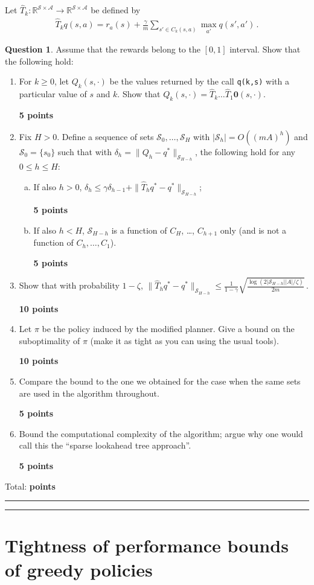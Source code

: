 \documentclass{article}
\newcommand{\norm}[1]{\| #1 \|}
\newcommand{\R}{\mathbb{R}}
\DeclareMathOperator*{\1}{\mathbbm{1}}
\newcommand{\0}{\mathbf{0}}
\newcounter{DocPoints}
\newcounter{QuestionPoints}
\newcommand{\points}[1]{	\par\mbox{}\par\noindent\hfill {\bf #1 points}	\addtocounter{DocPoints}{#1}
	\addtocounter{QuestionPoints}{#1}
}
\newcommand{\tpoints}[1]{        	\ifthenelse{\isempty{#1}}	{	}	{		\addtocounter{DocPoints}{#1}
		\addtocounter{QuestionPoints}{#1}
	}													 	\par\mbox{}\par\noindent\hfill {Total: \bf \arabic{QuestionPoints}\xspace points}\par\mbox{}\par\hrule\hrule
	\setcounter{QuestionPoints}{0}
}
\theoremstyle{definition}
\newtheorem{question}{Question}
\theoremstyle{remark}
\newcommand{\cS}{\mathcal{S}}
\newcommand{\cA}{\mathcal{A}}
\begin{document}
Let $\hat T_k: \R^{\cS \times \cA} \to \R^{\cS \times \cA}$ be defined by 
\begin{align*}
\hat T_k q (s,a) = r_a(s) + \frac{\gamma}{m} \sum_{s'\in C_k(s,a)} \max_{a'} q(s',a')\,.
\end{align*}

\begin{question}
Assume that the rewards belong to the $[0,1]$ interval.
Show that the following hold:
\begin{enumerate}
\item For $k\ge 0$, let $Q_k(s,\cdot)$ be the values returned by the call {\tt q(k,s)} with a particular value of $s$ and $k$. Show that $Q_k(s,\cdot) = \hat T_k \dots \hat T_1 \0 (s,\cdot)$.
\points{5}
\item Fix $H>0$. Define a sequence of sets $\cS_0,\dots,\cS_H$ with $|\cS_h| = O( (mA)^h)$ and $\cS_0 = \{s_0\}$ such that with $\delta_h = \norm{Q_h - q^*}_{\cS_{H-h}}$, the following hold for any $0\le h \le H$:
\begin{enumerate}[(a)]
\item If also $h>0$, $\delta_h \le \gamma \delta_{h-1} + \norm{ \hat T_h q^* - q^* }_{\cS_{H-h}}$;
\points{5}
\item If also $h<H$, $\cS_{H-h}$ is a function of $C_H$, \dots, $C_{h+1}$ only (and is not a function of $C_{h},\dots,C_1$).
\points{5}
\end{enumerate}
\item Show that with probability $1-\zeta$, $\norm{ \hat T_h q^* - q^* }_{\cS_{H-h}}\le \frac{1}{1-\gamma} \sqrt{ \frac{\log(2|\cS_{H-h}||A|/\zeta)}{2m} }$\,.
\points{10}
\item Let $\pi$ be the policy induced by the modified planner. Give a bound on the suboptimality of $\pi$ (make it as tight as you can using the usual tools).
\points{10}
\item Compare the bound to the one we obtained for the case when the same sets are used in the algorithm throughout.
\points{5}
\item Bound the computational complexity of the algorithm; argue why one would call this the ``sparse lookahead tree approach''.
\points{5}
\end{enumerate}
\tpoints{}
\end{question}



\section*{Tightness of performance bounds of greedy policies}
\end{document}
